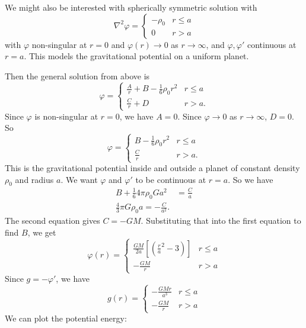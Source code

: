 \documentclass[a4paper]{article}
\begin{document}
\begin{eg}
  We might also be interested with spherically symmetric solution with
  \[
    \nabla^2 \varphi = 
    \begin{cases}
      -\rho_0 & r \leq a\\
      0 & r > a
    \end{cases}
  \]
  with $\varphi$ non-singular at $r = 0$ and $\varphi(r) \to 0$ as $r\to \infty$, and $\varphi, \varphi'$ continuous at $r = a$. This models the gravitational potential on a uniform planet.

  Then the general solution from above is
  \[
    \varphi =
    \begin{cases}
      \frac{A}{r} + B - \frac{1}{6}\rho_0 r^2 & r \leq a\\
      \frac{C}{r} + D & r > a.
    \end{cases}
  \]
  Since $\varphi$ is non-singular at $r = 0$, we have $A = 0$. Since $\varphi \to 0$ as $r\to \infty$, $D = 0$. So
  \[
    \varphi =
    \begin{cases}
      B - \frac{1}{6}\rho_0 r^2 & r \leq a\\
      \frac{C}{r} & r > a.
    \end{cases}
  \]
  This is the gravitational potential inside and outside a planet of constant density $\rho_0$ and radius $a$.
  We want $\varphi$ and $\varphi'$ to be continuous at $r = a$. So we have
  \begin{align*}
    B + \frac{1}{6}4\pi \rho_0 Ga^2 &= \frac{C}{a}\\
    \frac{4}{3}\pi G\rho_0 a = -\frac{C}{a^2}.
  \end{align*}
  The second equation gives $C = -GM$. Substituting that into the first equation to find $B$, we get
  \[
    \varphi (r) =
    \begin{cases}
      \frac{GM}{2a}\left[\left(\frac{r}{a}^2 - 3\right)\right] & r \leq a\\
      -\frac{GM}{r} & r > a
    \end{cases}
  \]
  Since $g = -\varphi'$, we have
  \[
    g(r) =
    \begin{cases}
      -\frac{GMr}{a^3}& r \leq a\\
      -\frac{GM}{r} & r > a
    \end{cases}
  \]
  We can plot the potential energy:
  \begin{center}
  \end{center}


\end{eg}
\end{document}
